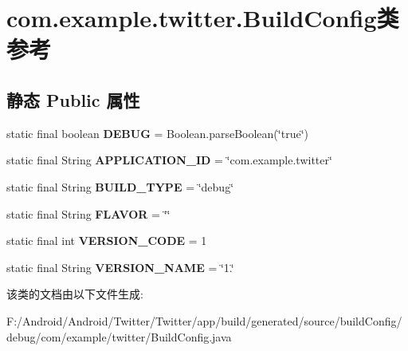\hypertarget{classcom_1_1example_1_1twitter_1_1_build_config}{}\section{com.\+example.\+twitter.\+Build\+Config类 参考}
\label{classcom_1_1example_1_1twitter_1_1_build_config}
\subsection*{静态 Public 属性}
\begin{DoxyCompactItemize}
\item 
\mbox{\label{classcom_1_1example_1_1twitter_1_1_build_config_ab096e9199ceca211433d8d06ccd4bd8a}} 
static final boolean {\bfseries D\+E\+B\+UG} = Boolean.\+parse\+Boolean(\char`\"{}true\char`\"{})
\item 
\mbox{\label{classcom_1_1example_1_1twitter_1_1_build_config_a028ac7ed2d53f8bed29dc7870c38bcb7}} 
static final String {\bfseries A\+P\+P\+L\+I\+C\+A\+T\+I\+O\+N\+\_\+\+ID} = \char`\"{}com.\+example.\+twitter\char`\"{}
\item 
\mbox{\label{classcom_1_1example_1_1twitter_1_1_build_config_abcd7e2248416f3efd7dbf0463056168f}} 
static final String {\bfseries B\+U\+I\+L\+D\+\_\+\+T\+Y\+PE} = \char`\"{}debug\char`\"{}
\item 
\mbox{\label{classcom_1_1example_1_1twitter_1_1_build_config_a33717466e11596f0f73852ba61802cae}} 
static final String {\bfseries F\+L\+A\+V\+OR} = \char`\"{}\char`\"{}
\item 
\mbox{\label{classcom_1_1example_1_1twitter_1_1_build_config_aac6499a92f0585e0a37c689db6754cff}} 
static final int {\bfseries V\+E\+R\+S\+I\+O\+N\+\_\+\+C\+O\+DE} = 1
\item 
\mbox{\label{classcom_1_1example_1_1twitter_1_1_build_config_a2f6e8ba39892752aab65352c8affbd7e}} 
static final String {\bfseries V\+E\+R\+S\+I\+O\+N\+\_\+\+N\+A\+ME} = \char`\"{}1.\char`\"{}
\end{DoxyCompactItemize}


该类的文档由以下文件生成\+:\begin{DoxyCompactItemize}
\item 
F\+:/\+Android/\+Android/\+Twitter/\+Twitter/app/build/generated/source/build\+Config/debug/com/example/twitter/Build\+Config.\+java\end{DoxyCompactItemize}
